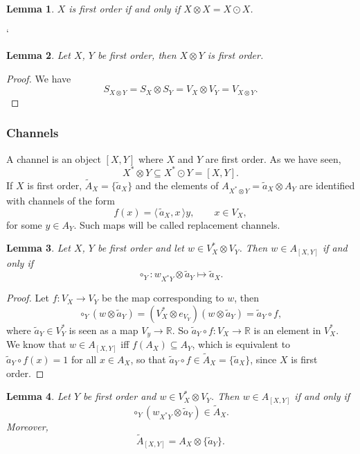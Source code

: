 \documentclass[12pt]{article}
\newtheorem{lemma}{Lemma}
\theoremstyle{definition}
\theoremstyle{remark}
\def\<{\langle\,}
\def\>{\,\rangle}
\begin{document}
\begin{lemma}\label{lemma:firstorder} $X$ is first order if and only if  $X\otimes
X=X\odot X$.

\end{lemma}
`
\begin{lemma}\label{lemma:1ordertensor} Let $X$, $Y$ be first order, then $X\otimes Y$ is
first order.

\end{lemma}

\begin{proof} We have
\[
S_{X\otimes Y}=S_X\otimes S_Y=V_X\otimes V_Y=V_{X\otimes Y}.
\]

\end{proof}


\subsubsection{Channels}
A channel is an object $[X,Y]$ where  $X$ and $Y$ are first order. As we have seen,
\[
X^*\otimes Y\subseteq X^*\odot Y=[X,Y].
\]
If $X$ is first order, $\tilde A_X=\{\tilde a_X\}$ and the elements of $A_{X^*\otimes
Y}=\tilde a_X\otimes A_Y$ are identified with channels of the form
\[
f(x)=\<\tilde a_X,x\>y,\qquad x\in V_X,
\]
for some $y\in A_Y$. Such maps will be called replacement channels.

\begin{lemma}\label{lemma:channels} Let $X$, $Y$ be first order and let  $w\in V_X^*\otimes V_Y$. Then $w
\in A_{[X,Y]}$ if and only if
\[
\circ_Y :w_{X^*Y}\otimes \tilde a_Y\mapsto \tilde a_X.
\]
\end{lemma}

\begin{proof} Let $f:V_X\to V_Y$ be the map corresponding to $w$, then 
\[
\circ_Y(w\otimes \tilde a_Y)=(V_X^*\otimes e_{V_Y})(w\otimes \tilde a_Y)=\tilde a_Y\circ
f,
\]
where $\tilde a_Y\in V_Y^*$ is seen as a map $V_y\to \mathbb R$. So $\tilde a_Y\circ f:
V_X\to \mathbb R$ is an element in $V_X^*$. We know that $w\in A_{[X,Y]}$ iff
$f(A_X)\subseteq A_Y$, which is equivalent to  $\tilde a_Y\circ f(x)=1$ for all $x\in A_X$, so
that $\tilde a_Y\circ f\in \tilde A_X=\{\tilde a_X\}$, since $X$ is first order.  
\end{proof}

\begin{lemma}\label{lemma:mapsdual} Let $Y$ be first order and $w\in V_X^*\otimes V_Y$.
Then $w\in A_{[X,Y]}$ if and only if
\[
\circ_Y(w_{X^*Y}\otimes \tilde a_Y)\in \tilde A_X.
\]
Moreover, 
\[
\tilde A_{[X,Y]}=A_X\otimes \{\tilde a_Y\}.
\]


\end{lemma}
\end{document}
